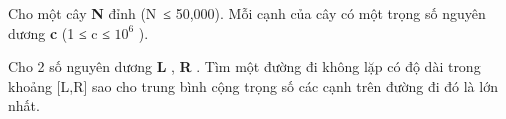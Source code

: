 Cho một cây   \textbf{    N   }   đỉnh (N ≤ 50,000). Mỗi cạnh của cây có một trọng số nguyên dương   \textbf{    c   }   (1 ≤ c ≤ $10^{6}$   ).  

   Cho 2 số nguyên dương   \textbf{    L   }   ,   \textbf{    R   }   . Tìm một đường đi không lặp có độ dài trong khoảng [L,R] sao cho trung bình cộng trọng số các cạnh trên đường đi đó là lớn nhất.